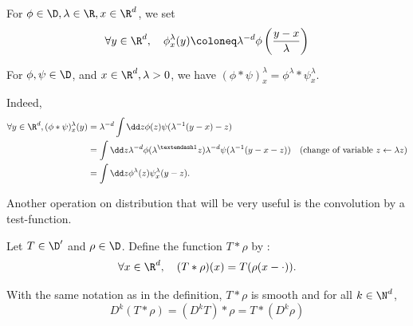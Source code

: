 \begin{definition}[Scaling]
    For $\phi \in \D, \lambda \in \R, x \in \R^d$, we set 
    $$\forall y \in \R^d, \quad \phi^\lambda_x(y) \coloneq \lambda^{-d} \phi \left(\frac{y-x}{\lambda}\right)$$
\end{definition}

\begin{remark}
    For $\phi,\psi \in \D$, and $x \in \R^d,\lambda>0$, we have $(\phi*\psi)^\lambda_x = \phi^\lambda * \psi^\lambda_x$.
    
    Indeed,
    \begin{align*}
        \forall y \in \R^d, (\phi*\psi)^\lambda_x (y) &= \lambda^{-d} \int\dd z \phi(z) \psi(\lambda^{-1}(y  - x) - z) \\
        &= \int \dd z \lambda^{-d} \phi(\lambda^{—1}z) \lambda^{-d} \psi(\lambda^{-1}(y - x - z)) \quad \text{(change of variable }z\leftarrow \lambda z) \\
        &= \int \dd z \phi^\lambda(z) \psi^\lambda_x(y - z).
    \end{align*}
\end{remark}

Another operation on distribution that will be very useful is the convolution by a test-function.

\begin{definition}
    Let $T\in \D'$ and $\rho \in \D$. Define the function $T*\rho$ by :
    \begin{equation*}
        \forall x \in \R^d, \quad (T*\rho)(x) = T(\rho(x - \cdot)).
    \end{equation*}    
\end{definition}

\begin{proposition}
    With the same notation as in the definition, $T*\rho$ is smooth and for all $k \in \N^d$, 
    \begin{equation*}
        D^k(T*\rho) = (D^kT) * \rho = T*(D^k\rho)
    \end{equation*}
\end{proposition}

